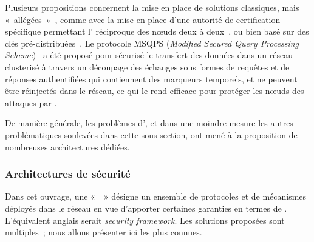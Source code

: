 Plusieurs propositions concernent la mise en place de solutions classiques, mais « allégées »~\cite{HWMRKP06}, comme avec la mise en place d'une autorité de certification spécifique permettant l' réciproque des nœuds deux à deux~\cite{GWZCK13}, ou bien basé sur des clés pré-distribuées~\cite{BSK13}.
Le protocole MSQPS (\textit{Modified Secured Query Processing Scheme})~\cite{GD14} a été proposé pour sécurisé le transfert des données dans un réseau clusterisé à travers un découpage des échanges sous formes de requêtes et de réponses authentifiées qui contiennent des marqueurs temporels, et ne peuvent être réinjectés dans le réseau, ce qui le rend efficace pour protéger les nœuds des attaques par .

De manière générale, les problèmes d', et dans une moindre mesure les autres problématiques soulevées dans cette sous-section, ont mené à la proposition de nombreuses architectures dédiées.

    \subsubsection{Architectures de sécurité}\label{ea:sss:archi}
Dans cet ouvrage, une «  » désigne un ensemble de protocoles et de mécanismes déployés dans le réseau en vue d'apporter certaines garanties en termes de \secu.
L'équivalent anglais serait \textit{security framework}.
Les solutions proposées sont multiples~\cite{HI12,GWZC13,SS14-rev}; nous allons présenter ici les plus connues.

